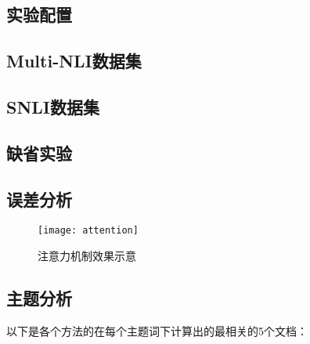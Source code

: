 \documentclass[UTF8,11pt,a4paper,nofonts]{ctexart}
\begin{document}
\subsection{实验配置}


\subsection{Multi-NLI数据集}
\subsection{SNLI数据集}
\subsection{缺省实验}

\subsection{误差分析}


\begin{figure}
\centering
\texttt{[image: attention]}
\caption{注意力机制效果示意}\label{fig:02}
\end{figure} 



\subsection{主题分析}


以下是各个方法的在每个主题词下计算出的最相关的5个文档：
\end{document}
